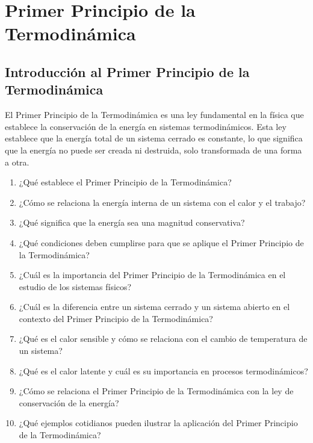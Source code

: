 \documentclass[../main]{subfiles}
\begin{document}
\chapter{Primer Principio de la Termodinámica}

\section{Introducción al Primer Principio de la Termodinámica}

El Primer Principio de la Termodinámica es una ley fundamental en la física que establece la conservación de la energía en sistemas termodinámicos. Esta ley establece que la energía total de un sistema cerrado es constante, lo que significa que la energía no puede ser creada ni destruida, solo transformada de una forma a otra.


\begin{enumerate}
    \item ¿Qué establece el Primer Principio de la Termodinámica?
    \item ¿Cómo se relaciona la energía interna de un sistema con el calor y el trabajo?
    \item ¿Qué significa que la energía sea una magnitud conservativa?
    \item ¿Qué condiciones deben cumplirse para que se aplique el Primer Principio de la Termodinámica?
    \item ¿Cuál es la importancia del Primer Principio de la Termodinámica en el estudio de los sistemas físicos?
    \item ¿Cuál es la diferencia entre un sistema cerrado y un sistema abierto en el contexto del Primer Principio de la Termodinámica?
    \item ¿Qué es el calor sensible y cómo se relaciona con el cambio de temperatura de un sistema?
    \item ¿Qué es el calor latente y cuál es su importancia en procesos termodinámicos?
    \item ¿Cómo se relaciona el Primer Principio de la Termodinámica con la ley de conservación de la energía?
    \item ¿Qué ejemplos cotidianos pueden ilustrar la aplicación del Primer Principio de la Termodinámica?
\end{enumerate}
\end{document}
